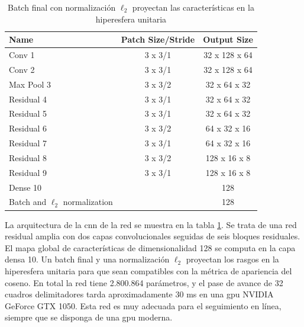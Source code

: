 \begin{table}[ht]
\centering
\caption{Batch final con normalización $\ell_2$ proyectan las características en la hiperesfera unitaria \cite{Wojke2017simple}}
\label{tab:final-bach-l2-normalization}
\begin{tabular}{lcc}
\hline
\textbf{Name}                    & \textbf{Patch Size/Stride} & \textbf{Output Size} \\ \hline
Conv 1                           & 3 x 3/1                    & 32 x 128 x 64        \\
Conv 2                           & 3 x 3/1                    & 32 x 128 x 64        \\
Max Pool 3                       & 3 x 3/2                    & 32 x 64 x 32         \\
Residual 4                       & 3 x 3/1                    & 32 x 64 x 32         \\
Residual 5                       & 3 x 3/1                    & 32 x 64 x 32         \\
Residual 6                       & 3 x 3/2                    & 64 x 32 x 16         \\
Residual 7                       & 3 x 3/1                    & 64 x 32 x 16         \\
Residual 8                       & 3 x 3/2                    & 128 x 16 x 8         \\
Residual 9                       & 3 x 3/1                    & 128 x 16 x 8         \\
Dense 10                         &                            & 128                  \\
Batch and $\ell_2$ normalization &                            & 128                  \\ \hline
\end{tabular}
\end{table}

La arquitectura de la \gls{cnn} de la red se muestra en la tabla \ref{tab:final-bach-l2-normalization}. Se trata de una red residual amplia con dos capas convolucionales seguidas de seis bloques residuales. El mapa global de características de dimensionalidad 128 se computa en la capa densa 10. Un batch final y una normalización $\ell_2$ proyectan los rasgos en la hiperesfera unitaria para que sean compatibles con la métrica de apariencia del coseno. En total la red tiene 2.800.864 parámetros, y el pase de avance de 32 cuadros delimitadores tarda aproximadamente 30 ms en una \gls{gpu} NVIDIA GeForce GTX 1050. Esta red es muy adecuada para el seguimiento en línea, siempre que se disponga de una \gls{gpu} moderna.
